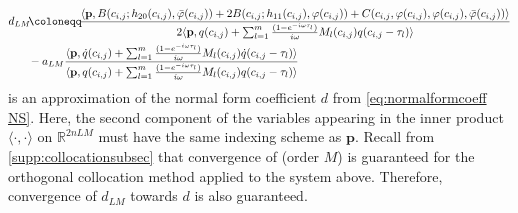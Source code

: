 \documentclass[english]{myarticle}
\begin{document}
\begin{sloppypar}
\begin{align*}
    d_{LM} \hspace{-2pt} &\coloneqq \hspace{-2pt} \frac{\langle \mathbf{p}, B(c_{i,j};h_{20}(c_{i,j}), \bar{\varphi}(c_{i,j})) + 2B(c_{i,j}; h_{11}(c_{i,j}),\varphi(c_{i,j})) + C(c_{i,j},\varphi(c_{i,j}),\varphi(c_{i,j}),\bar{\varphi}(c_{i,j})) \rangle}{2\langle \mathbf{p}, q(c_{i,j}) + \sum_{l=1}^m \frac{(1-e^{-i\omega \tau_l})}{i\omega} M_l(c_{i,j}) q(c_{i,j}-\tau_l) \rangle} \\
    & -a_{LM} \frac{\langle \mathbf{p}, \dot{q}(c_{i,j}) + \sum_{l=1}^m \frac{(1-e^{-i\omega \tau_l})}{i\omega} M_l(c_{i,j}) \dot{q}(c_{i,j} - \tau_l)\rangle}{\langle \mathbf{p}, q(c_{i,j}) + \sum_{l=1}^m \frac{(1-e^{-i\omega \tau_l})}{i\omega} M_l(c_{i,j}) q(c_{i,j}-\tau_l) \rangle}
\end{align*}
is an approximation of the normal form coefficient $d$ from \eqref{eq:normalformcoeff NS}. Here, the second component of the variables appearing in the inner product $\langle \cdot , \cdot \rangle$ on $\mathbb{R}^{2nLM}$ must have the same indexing scheme as $\mathbf{p}$. Recall from \cref{supp:collocationsubsec} that convergence of (order $M$) is guaranteed for the orthogonal collocation method applied to the system above. Therefore, convergence of $d_{LM}$ towards $d$ is also guaranteed.
\end{sloppypar}

\clearpage


\end{document}
